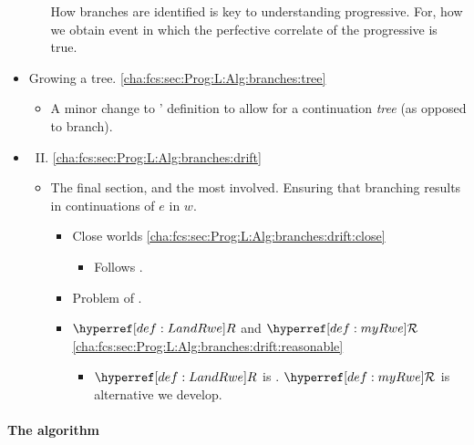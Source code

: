 \begin{note}[Division]
\begin{itemize}[noitemsep]
\begin{itemize}
      How branches are identified is key to understanding progressive.
      For, how we obtain event in which the perfective correlate of the progressive is true.
    \end{itemize}
  \item Growing a tree.%
    \hfill\autoref{cha:fcs:sec:Prog:L:Alg:branches:tree}
    \begin{itemize}
    \item
      A minor change to \citeauthor{Landman:1992wh}' definition to allow for a continuation \emph{tree} (as opposed to branch).
    \end{itemize}
  \item
    ~II.%
    \hfill\autoref{cha:fcs:sec:Prog:L:Alg:branches:drift}
    \begin{itemize}
    \item
      The final section, and the most involved.
      Ensuring that branching results in  continuations of \(e\) in \(w\).
      \begin{itemize}
      \item
        Close worlds%
        \hfill\autoref{cha:fcs:sec:Prog:L:Alg:branches:drift:close}
        \begin{itemize}
        \item
          Follows \citeauthor{Landman:1992wh}.
        \end{itemize}
      \item
        Problem of \ndrAdj{} .
      \item
        \(\lRweSym{}\) and \(\mRweSym{}\)%
        \hfill\autoref{cha:fcs:sec:Prog:L:Alg:branches:drift:reasonable}
        \begin{itemize}
        \item
          \(\lRweSym{}\) is \citeauthor{Landman:1992wh}.
          \(\mRweSym{}\) is alternative we develop.
        \end{itemize}
      \end{itemize}
    \end{itemize}
  \end{itemize}
\end{note}

\paragraph{The algorithm}
\label{cha:fcs:sec:Prog:L:Alg:branches:alg}


